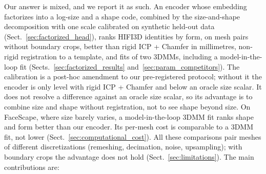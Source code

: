 \documentclass[10pt,twocolumn,letterpaper]{article}
\begin{document}
Our answer is mixed, and we report it as such. An encoder whose embedding factorizes into a log-size and a shape code, combined by the size-and-shape decomposition with one scale calibrated on synthetic held-out data (Sect.~\ref{sec:factorized_head}), ranks HIFI3D identities by form, on mesh pairs without boundary crops, better than rigid ICP + Chamfer in millimetres, non-rigid registration to a template, and fits of two 3DMMs, including a model-in-the-loop fit (Sects.~\ref{sec:factorized_results} and~\ref{sec:param_competitors}). The calibration is a post-hoc amendment to our pre-registered protocol; without it the encoder is only level with rigid ICP + Chamfer and below an oracle size scalar. It does not resolve a difference against an oracle size scalar, so its advantage is to combine size and shape without registration, not to see shape beyond size. On FaceScape, where size barely varies, a model-in-the-loop 3DMM fit ranks shape and form better than our encoder. Its per-mesh cost is comparable to a 3DMM fit, not lower (Sect.~\ref{sec:computational_cost}). All these comparisons pair meshes of different discretizations (remeshing, decimation, noise, upsampling); with boundary crops the advantage does not hold (Sect.~\ref{sec:limitations}). The main contributions are:
\end{document}
